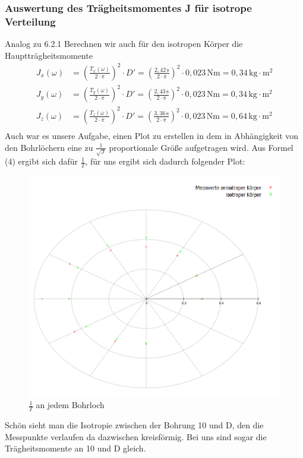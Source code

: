\documentclass[fontsize=12pt]{scrartcl}
\begin{document}
\subsubsection{Auswertung des Trägheitsmomentes J für isotrope Verteilung}
Analog zu 6.2.1 Berechnen wir auch für den isotropen Körper die Hauptträgheitsmomente
\begin{align*}
J_x(\omega) &=\left ( \frac{T_x(\omega)}{2 \cdot \pi }\right)^2 \cdot D' = \left ( \frac{2,42\,\text{s}}{2 \cdot \pi }\right)^2 \cdot  0,023\,\text{Nm}
=0,34\,\text{kg$\cdot$m$^2$} \\
J_y(\omega) &=\left ( \frac{T_y(\omega)}{2 \cdot \pi }\right)^2 \cdot D' = \left ( \frac{2,43\,\text{s}}{2 \cdot \pi }\right)^2 \cdot  0,023\,\text{Nm}
=0,34\,\text{kg$\cdot$m$^2$} \\
J_z(\omega) &=\left ( \frac{T_z(\omega)}{2 \cdot \pi }\right)^2 \cdot D' = \left ( \frac{3,36\,\text{s}}{2 \cdot \pi }\right)^2 \cdot  0,023\,\text{Nm}
=0,64\,\text{kg$\cdot$m$^2$} \\
\end{align*}
\noindent
Auch war es unsere Aufgabe, einen Plot zu erstellen in dem in Abhängigkeit von den Bohrlöchern eine zu $\frac{1}{\sqrt J}$ proportionale Größe aufgetragen wird. Aus Formel (4) ergibt sich dafür $\frac{1}{T}$, für uns ergibt sich dadurch folgender Plot:

\begin{figure}[h!]
\centering
  \includegraphics[scale=0.5]{Graphik/plot}
                \caption{$\frac{1}{T}$ an jedem Bohrloch }
\end{figure}
\noindent
Schön sieht man die Isotropie zwischen der Bohrung 10 und D, den die Messpunkte verlaufen da dazwischen kreisförmig. Bei uns sind sogar die Trägheitsmomente an 10 und D gleich.  
\newpage
\noindent
\end{document}

